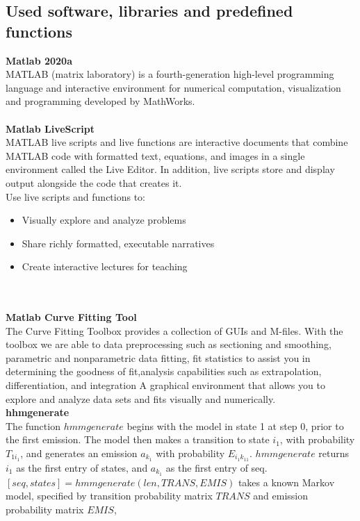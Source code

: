 \subsection{Used software, libraries and predefined functions} \label{subsec:libraries}
\textbf{Matlab 2020a}\\
MATLAB (matrix laboratory) is a fourth-generation high-level programming language and interactive environment for numerical
computation, visualization and programming developed by MathWorks.\\
\\
\textbf{Matlab LiveScript}~\cite{livescript}\\
MATLAB live scripts and live functions are interactive documents that combine MATLAB code with formatted text, equations,
and images in a single environment called the Live Editor.
In addition, live scripts store and display output alongside the code that creates it.\\
Use live scripts and functions to:\\
\begin{itemize}
    \item Visually explore and analyze problems
    \item Share richly formatted, executable narratives
    \item Create interactive lectures for teaching
\end{itemize}\\
\\
\textbf{Matlab Curve Fitting Tool}\\
The Curve Fitting Toolbox provides a collection of GUIs and M-files.
With the toolbox we are able to data preprocessing such as sectioning and smoothing, parametric and nonparametric data fitting,
fit statistics to assist you in determining the goodness of fit,analysis capabilities such as extrapolation, differentiation, and integration
A graphical environment that allows you to explore and analyze data sets and fits visually and numerically.\\
\textbf{hhmgenerate}~\cite{hhmgenerate}\\
The function $hmmgenerate$ begins with the model in state 1 at step 0, prior to the first emission.
The model then makes a transition to state $i_1$, with probability $T_{1i_1}$, and generates an emission $a_k_1$ with probability $E_{i_1k_11}$.
$hmmgenerate$ returns $i_1$ as the first entry of states, and $a_k_1$ as the first entry of seq.
$[seq,states] = hmmgenerate(len,TRANS,EMIS)$ takes a known Markov model, specified by transition probability matrix $TRANS$ and emission probability matrix $EMIS$,
